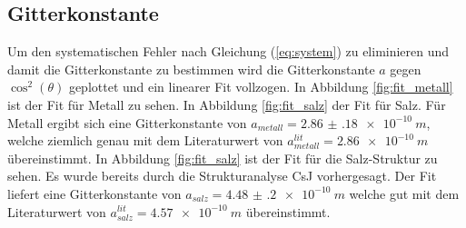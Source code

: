 \subsection{Gitterkonstante}

Um den systematischen Fehler nach Gleichung (\ref{eq:system}) zu eliminieren und damit die Gitterkonstante zu bestimmen wird die Gitterkonstante $a$ gegen $\cos^2(\theta)$ geplottet und ein linearer Fit vollzogen. In Abbildung \ref{fig:fit_metall} ist der Fit für Metall zu sehen. In Abbildung \ref{fig:fit_salz} der Fit für Salz. Für Metall ergibt sich eine Gitterkonstante von $a_{metall} = \SI{2.86(18)e-10}{m}$, welche ziemlich genau mit dem Literaturwert von $a_{metall}^{lit} = \SI{2.86e-10}{m}$ \cite{metall} übereinstimmt. In Abbildung \ref{fig:fit_salz} ist der Fit für die Salz-Struktur zu sehen. Es wurde bereits durch die Strukturanalyse CsJ vorhergesagt. Der Fit liefert eine Gitterkonstante von $a_{salz} = \SI{4.48(20)e-10}{m}$ welche gut mit dem Literaturwert von $a_{salz}^{lit} = \SI{4.57e-10}{m}$ \cite{Gross} übereinstimmt.

